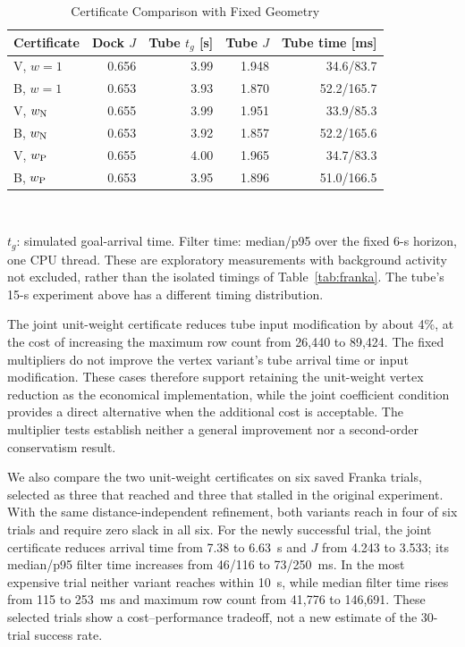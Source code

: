 \documentclass[journal]{IEEEtran}
\theoremstyle{definition}
\begin{document}
\begin{table}[t]
\caption{Certificate Comparison with Fixed Geometry}
\label{tab:cert-comparison}
\centering\footnotesize
\setlength{\tabcolsep}{3pt}
\begin{tabular}{lrrrr}
\toprule
Certificate & Dock $J$ & Tube $t_g$ [s] & Tube $J$ & Tube time [ms]\\
\midrule
V, $w=1$       & 0.656 & 3.99 & 1.948 & 34.6/83.7\\
B, $w=1$       & 0.653 & 3.93 & 1.870 & 52.2/165.7\\
V, $w_{\rm N}$ & 0.655 & 3.99 & 1.951 & 33.9/85.3\\
B, $w_{\rm N}$ & 0.653 & 3.92 & 1.857 & 52.2/165.6\\
V, $w_{\rm P}$ & 0.655 & 4.00 & 1.965 & 34.7/83.3\\
B, $w_{\rm P}$ & 0.653 & 3.95 & 1.896 & 51.0/166.5\\
\bottomrule
\end{tabular}
\\[3pt]
\parbox{\columnwidth}{\footnotesize $t_g$: simulated goal-arrival time. Filter time: median/p95
over the fixed 6-s horizon, one CPU thread. These are exploratory measurements with background
activity not excluded, rather than the isolated timings of Table~\ref{tab:franka}. The tube's
15-s experiment above has a different timing distribution.}
\end{table}

The joint unit-weight certificate reduces tube input modification by about 4\%, at the cost
of increasing the maximum row count from 26{,}440 to 89{,}424. The fixed multipliers do not
improve the vertex variant's tube arrival time or input modification. These cases therefore
support retaining the unit-weight vertex reduction as the economical implementation, while
the joint coefficient condition provides a direct alternative when the additional cost is
acceptable. The multiplier tests establish neither a general improvement nor a second-order
conservatism result.

We also compare the two unit-weight certificates on six saved Franka trials, selected as three
that reached and three that stalled in the original experiment. With the same distance-independent
refinement, both variants reach in four of six trials and require zero slack in all six.
For the newly successful trial, the joint certificate reduces arrival time from 7.38 to 6.63~s
and $J$ from 4.243 to 3.533; its median/p95 filter time increases from 46/116 to 73/250~ms.
In the most expensive trial neither variant reaches within 10~s, while median filter time rises
from 115 to 253~ms and maximum row count from 41{,}776 to 146{,}691. These selected trials
show a cost--performance tradeoff, not a new estimate of the 30-trial success rate.
\end{document}
